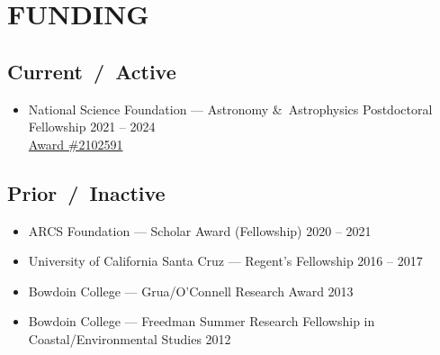 \section*{FUNDING}
\subsection*{\textbf{Current~/~Active}}
\begin{itemize}[leftmargin=0pt,label={},itemsep=1ex]
\item National Science Foundation --- Astronomy \&\ Astrophysics Postdoctoral Fellowship \hfill 2021 -- 2024\\
\href{https://www.nsf.gov/awardsearch/showAward?AWD_ID=2102591}{Award \#2102591}
\end{itemize}

\subsection*{\textbf{Prior~/~Inactive}}
\begin{itemize} [leftmargin=0pt,label={},itemsep=1ex]
\item ARCS Foundation --- Scholar Award (Fellowship) \hfill 2020 -- 2021
\item University of California Santa Cruz  --- Regent’s Fellowship \hfill 2016 – 2017
\item Bowdoin College --- Grua/O’Connell Research Award  \hfill 2013
\item Bowdoin College --- Freedman Summer Research Fellowship in Coastal/Environmental Studies \hfill 2012
\end{itemize}